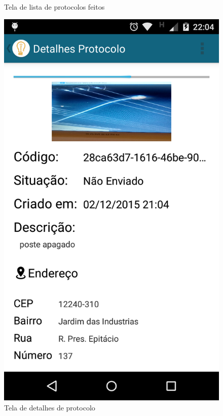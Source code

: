 \documentclass[
	article,			%
	11pt,				%
	oneside,			%
	a4paper,			%
	english,			%
	brazil,				%
	sumario=tradicional
	]{abntex2}
\begin{document}
\begin{figure}[!htbp]
 \centering
  \begin{minipage}{0.4\textwidth}
    \centering
    \caption{\label{android-tela-lista-chamadas}Tela de lista de protocolos feitos}
    \includegraphics[scale=0.1]{android/8.png}
  \end{minipage}
  \hfill
  \begin{minipage}{0.4\textwidth}
    \centering
    \caption{\label{android-tela-detalhes-chamada}Tela de detalhes de protocolo}

\end{minipage}
\end{figure}
\end{document}
